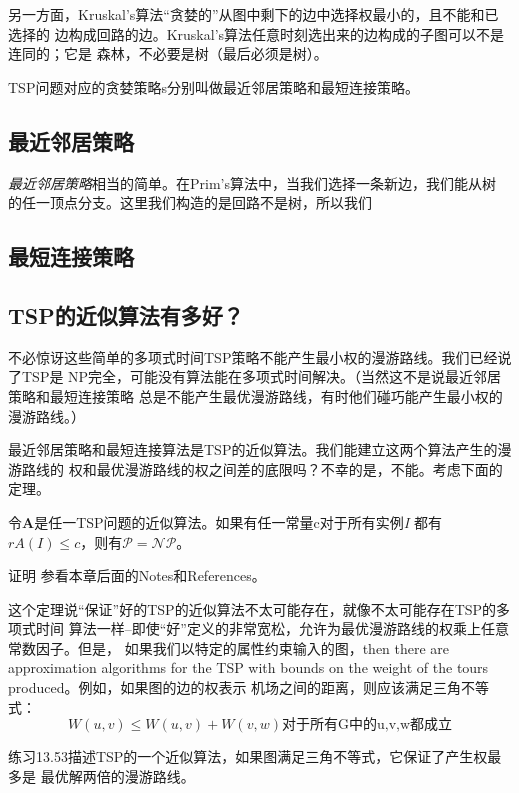 另一方面，Kruskal's算法“贪婪的”从图中剩下的边中选择权最小的，且不能和已选择的
边构成回路的边。Kruskal's算法任意时刻选出来的边构成的子图可以不是连同的；它是
森林，不必要是树（最后必须是树）。

TSP问题对应的贪婪策略s分别叫做最近邻居策略和最短连接策略。

\subsection{最近邻居策略}
\emph{最近邻居策略}相当的简单。在Prim's算法中，当我们选择一条新边，我们能从树
的任一顶点分支。这里我们构造的是回路不是树，所以我们

\subsection{最短连接策略}

\subsection{TSP的近似算法有多好？}
不必惊讶这些简单的多项式时间TSP策略不能产生最小权的漫游路线。我们已经说了TSP是
NP完全，可能没有算法能在多项式时间解决。（当然这不是说最近邻居策略和最短连接策略
总是不能产生最优漫游路线，有时他们碰巧能产生最小权的漫游路线。）

最近邻居策略和最短连接算法是TSP的近似算法。我们能建立这两个算法产生的漫游路线的
权和最优漫游路线的权之间差的底限吗？不幸的是，不能。考虑下面的定理。

\begin{theorem}
令\textbf{A}是任一TSP问题的近似算法。如果有任一常量c对于所有实例\emph{I} 都有
$rA(I)\leq c$，则有$\mathcal {P}=\mathcal {NP}$。

证明  参看本章后面的Notes和References。
\end{theorem}

这个定理说“保证”好的TSP的近似算法不太可能存在，就像不太可能存在TSP的多项式时间
算法一样--即使“好”定义的非常宽松，允许为最优漫游路线的权乘上任意常数因子。但是，
如果我们以特定的属性约束输入的图，then there are approximation algorithms for the
 TSP with bounds on the weight of the tours produced。例如，如果图的边的权表示
 机场之间的距离，则应该满足三角不等式：
\begin{equation}
W(u,v)\leq W(u,v) + W(v, w)   \mbox{对于所有G中的u,v,w都成立}
\end{equation}

练习13.53描述TSP的一个近似算法，如果图满足三角不等式，它保证了产生权最多是
最优解两倍的漫游路线。
